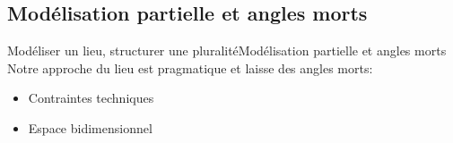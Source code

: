 \documentclass[9pt]{beamer}
\begin{document}
\subsection{Modélisation partielle et angles morts}
\begin{frame}{Modéliser un lieu, structurer une pluralité}{Modélisation partielle et angles morts}
	Notre approche du lieu est pragmatique et laisse des angles morts:
	\begin{itemize}
		\item Contraintes techniques
		 \item Espace bidimensionnel
	\end{itemize}
\end{frame}
\end{document}
